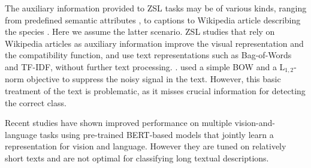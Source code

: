 \documentclass[11pt,a4paper]{article}
\begin{document}





The auxiliary information provided to ZSL tasks may be of various kinds, ranging from predefined semantic attributes \cite{lampert2009learning,changpinyo2020classifier,atzmon2018probabilistic}, to captions \cite{Xian_2018_CVPR,Sariyildiz_2019_CVPR} to Wikipedia article describing the species \cite{elhoseiny2017link}.
Here we assume the latter scenario. ZSL studies that rely on Wikipedia articles as auxiliary information improve the visual representation and the compatibility function, and use text representations such as Bag-of-Words and TF-IDF, without further text processing. \cite{lei2015predicting,elhoseiny2013write,elhoseiny2016write,elhoseiny2017link,zhu2018generative}. \citet{qiao2016less} used a simple BOW and a L$_{1,2}$-norm objective to suppress the noisy signal in the text. However, this basic treatment of the text is problematic, as it misses crucial information for detecting the correct class. 


Recent studies \citep{lu2019vilbert,tan2019lxmert} have shown improved performance on multiple vision-and-language tasks using pre-trained BERT-based models that jointly learn a representation for vision and language. However they are tuned on relatively short texts and are not optimal for classifying long textual descriptions.  %


\end{document}
